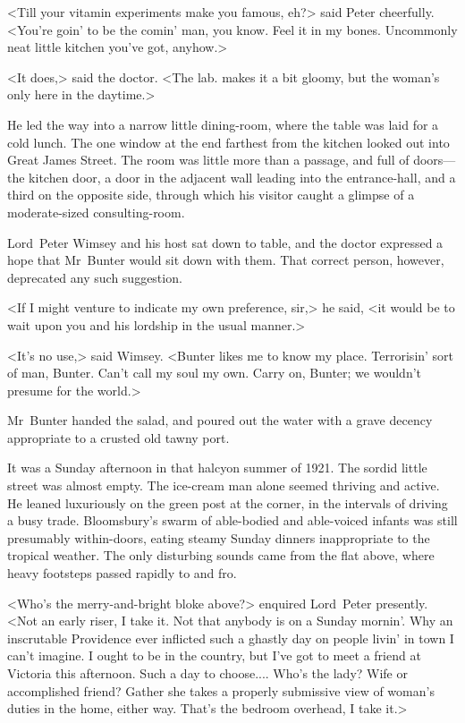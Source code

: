 <Till your vitamin experiments make you famous, eh?> said Peter cheerfully. <You're goin' to be the comin' man, you know. Feel it in my bones. Uncommonly neat little kitchen you've got, anyhow.>

<It does,> said the doctor. <The lab. makes it a bit gloomy, but the woman's only here in the daytime.>

He led the way into a narrow little dining-room, where the table was laid for a cold lunch. The one window at the end farthest from the kitchen looked out into Great James Street. The room was little more than a passage, and full of doors—the kitchen door, a door in the adjacent wall leading into the entrance-hall, and a third on the opposite side, through which his visitor caught a glimpse of a moderate-sized consulting-room.

Lord~Peter Wimsey and his host sat down to table, and the doctor expressed a hope that Mr~Bunter would sit down with them. That correct person, however, deprecated any such suggestion.

<If I might venture to indicate my own preference, sir,> he said, <it would be to wait upon you and his lordship in the usual manner.>

<It's no use,> said Wimsey. <Bunter likes me to know my place. Terrorisin' sort of man, Bunter. Can't call my soul my own. Carry on, Bunter; we wouldn't presume for the world.>

Mr~Bunter handed the salad, and poured out the water with a grave decency appropriate to a crusted old tawny port.

It was a Sunday afternoon in that halcyon summer of 1921. The sordid little street was almost empty. The ice-cream man alone seemed thriving and active. He leaned luxuriously on the green post at the corner, in the intervals of driving a busy trade. Bloomsbury's swarm of able-bodied and able-voiced infants was still presumably within-doors, eating steamy Sunday dinners inappropriate to the tropical weather. The only disturbing sounds came from the flat above, where heavy footsteps passed rapidly to and fro.

<Who's the merry-and-bright bloke above?> enquired Lord~Peter presently. <Not an early riser, I take it. Not that anybody is on a Sunday mornin'. Why an inscrutable Providence ever inflicted such a ghastly day on people livin' in town I can't imagine. I ought to be in the country, but I've got to meet a friend at Victoria this afternoon. Such a day to choose.... Who's the lady? Wife or accomplished friend? Gather she takes a properly submissive view of woman's duties in the home, either way. That's the bedroom overhead, I take it.>

